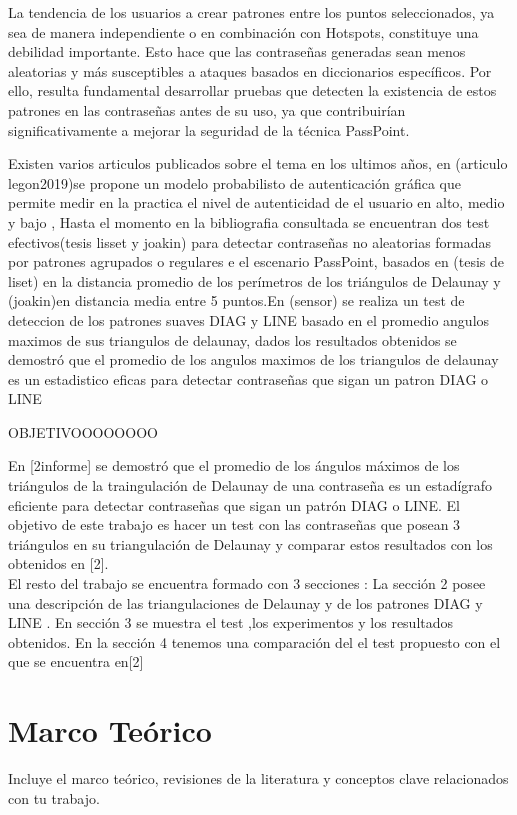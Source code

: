 \documentclass[12pt]{report}
\begin{document}
	La tendencia de los usuarios a crear patrones entre los puntos seleccionados, ya sea de manera independiente o en combinación con Hotspots, constituye una debilidad importante. Esto hace que las contraseñas generadas sean menos aleatorias y más susceptibles a ataques basados en diccionarios específicos. Por ello, resulta fundamental desarrollar pruebas que detecten la existencia de estos patrones en las contraseñas antes de su uso, ya que contribuirían significativamente a mejorar la seguridad de la técnica PassPoint.
	
	Existen varios articulos publicados sobre el tema en los ultimos años, en (articulo legon2019)se propone un modelo probabilisto de autenticación gráfica que permite medir en la practica el nivel de autenticidad de el usuario en alto, medio y bajo , Hasta el momento en la bibliografia consultada se encuentran dos test efectivos(tesis lisset y joakin) para detectar contraseñas no aleatorias formadas por patrones agrupados o regulares e el escenario PassPoint, basados en (tesis de liset) en la distancia promedio de los perímetros de los triángulos de Delaunay y (joakin)en distancia media entre 5 puntos.En (sensor) se realiza un test de deteccion de los patrones suaves  DIAG y LINE basado en el promedio angulos maximos de sus triangulos de delaunay, dados los resultados obtenidos se demostró que el promedio de los angulos maximos de los triangulos de delaunay es un estadistico eficas para detectar contraseñas que sigan un patron DIAG o LINE
	
	OBJETIVOOOOOOOO 
	
	En [2informe] se demostró que el promedio de los ángulos máximos de los triángulos de la traingulación de Delaunay de una contraseña es un estadígrafo eficiente para detectar contraseñas que sigan un patrón DIAG o LINE. El objetivo de este trabajo es hacer un test con las contraseñas que posean 3 triángulos en su triangulación de Delaunay y comparar estos resultados con los obtenidos en [2].\\
	
	El resto del trabajo se encuentra formado con 3 secciones : La sección 2 posee una descripción de las triangulaciones de Delaunay y de los patrones DIAG y LINE . En sección 3 se muestra el test ,los experimentos y los resultados obtenidos. En la sección 4 tenemos una comparación del el test propuesto con el que se encuentra en[2]
\setcounter{chapter}{0}
\chapter{Marco Teórico}
Incluye el marco teórico, revisiones de la literatura y conceptos clave relacionados con tu trabajo.
\end{document}
